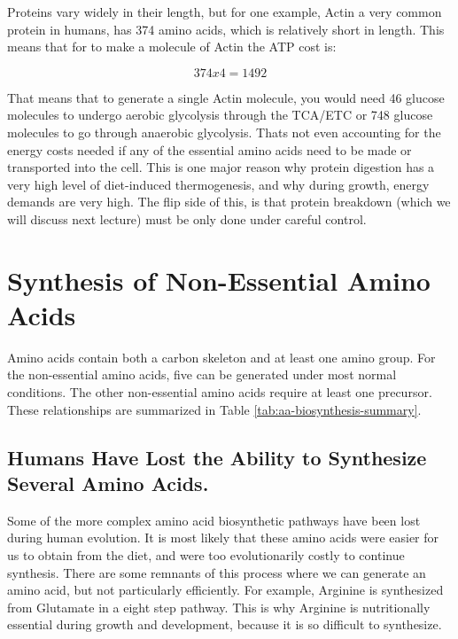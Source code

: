 \documentclass{tufte-handout}
\begin{document}
Proteins vary widely in their length, but for one example, Actin a very common protein in humans, has 374 amino acids, which is relatively short in length.  This means that for to make a molecule of Actin the ATP cost is:

\begin{equation}
374 x 4 = 1492 
\end{equation}

That means that to generate a single Actin molecule, you would need 46 glucose molecules to undergo aerobic glycolysis through the TCA/ETC or 748 glucose molecules to go through anaerobic glycolysis. Thats not even accounting for the energy costs needed if any of the essential amino acids need to be made or transported into the cell.  This is one major reason why protein digestion has a very high level of diet-induced thermogenesis, and why during growth, energy demands are very high.  The flip side of this, is that protein breakdown (which we will discuss next lecture) must be only done under careful control.

\section{Synthesis of Non-Essential Amino Acids}

Amino acids contain both a carbon skeleton and at least one amino group.  For the non-essential amino acids, five can be generated under most normal conditions.  The other non-essential amino acids require at least one precursor.  These relationships are summarized in Table \ref{tab:aa-biosynthesis-summary}.

\subsection{Humans Have Lost the Ability to Synthesize Several Amino Acids.}  Some of the more complex amino acid biosynthetic pathways have been lost during human evolution.  It is most likely that these amino acids were  easier for us to obtain from the diet, and were too evolutionarily costly to continue synthesis.  There are some remnants of this process where we can generate an amino acid, but not particularly efficiently.   For example, Arginine is synthesized from Glutamate in a eight step pathway.  This is why Arginine is nutritionally essential during growth and development, because it is so difficult to synthesize.
\end{document}
